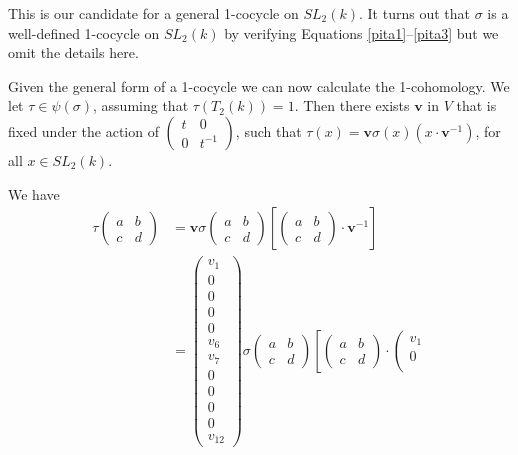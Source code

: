 This is our candidate for a general 1-cocycle on $SL_2(k)$. It turns out that $\sigma$ is a well-defined 1-cocycle on $SL_2(k)$ by verifying Equations \ref{pita1}--\ref{pita3} but we omit the details here.

Given the general form of a 1-cocycle we can now calculate the 1-cohomology. 
We let $\tau \in \psi(\sigma)$, assuming that $\tau(T_2(k)) = 1$.
Then there exists $\mathbf{v}$ in $V$ that is fixed under the action of $\left(\begin{matrix}t & 0 \\ 0 & t^{-1}\end{matrix}\right)$, such that $\tau(x) = \mathbf{v}\sigma(x)(x\cdot\mathbf{v}^{-1})$, for all $x\in SL_2(k)$.

We have
\begin{align*}
\tau\left(\begin{matrix} a & b \\ c & d \end{matrix}\right) &=
\mathbf{v}\sigma\left(\begin{matrix} a & b \\ c & d \end{matrix}\right) \left[
\left(\begin{matrix} a & b \\ c & d \end{matrix}\right) \cdot \mathbf{v}^{-1}\right]\\
&=
\left(\begin{matrix} 
v_1  \\
0 \\
0 \\
0 \\
0 \\
v_6 \\
v_7 \\
0 \\
0 \\
0 \\
0 \\
v_{12}
\end{matrix}\right)
\sigma\left(\begin{matrix} a & b \\ c & d \end{matrix}\right) \left[
\left(\begin{matrix} a & b \\ c & d \end{matrix}\right) \cdot 
\left(\begin{matrix} 
v_1  \\
0 \\

\end{matrix}
\end{align*}
